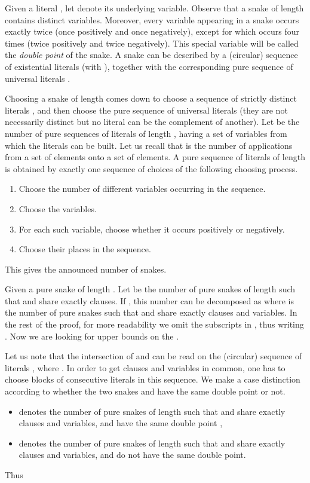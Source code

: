 \documentclass[aop,noinfoline]{imsart}
\renewcommand{\Box}{{\vrule width0.6ex height1em depth0cm}}
\newenvironment{proof}{\noindent{\bf Proof:}}{\hfill \Box}
\begin{document}
\begin{proof}
Given a literal , let  denote its underlying variable. Observe that a snake of length  contains  distinct variables.  Moreover, every variable  appearing in a snake occurs exactly twice (once positively and once negatively), except for  which occurs four times (twice positively and twice negatively). This special variable will be called the \emph{double point} of the snake. A snake can be   described by a (circular) sequence of existential literals  (with ), together with the corresponding pure sequence of universal literals . 

Choosing a snake  of length  comes down to choose a sequence of   strictly distinct
literals ,   and then   choose the pure sequence of  universal literals  (they are not necessarily distinct but no literal can be the
  complement of another).
  Let  be the number of pure sequences of literals of length
  , having a set of  variables from which the literals can be
  built.  Let us recall that  is the number of
  applications from a set of  elements onto a set of  elements.
  A pure sequence of literals of length  is obtained by exactly
  one sequence of choices of the following choosing process.
  \begin{enumerate}
  \item Choose the number  of different variables occurring in the
    sequence.
  \item Choose the  variables.
  \item For each such variable, choose whether it occurs positively or
    negatively.
  \item Choose their places in the sequence.
  \end{enumerate}
This gives the announced number of snakes.
\medskip

Given a pure snake  of length . Let  be the
number of pure snakes  of length   such  that  and  share exactly  
clauses. If , this number can be decomposed as
 where  is the number of  pure snakes  such  that  and  share exactly   clauses and  variables. In the rest of the proof, for more readability we omit the subscripts  in , thus writing . Now we are looking for  upper bounds on the .

Let us note that the intersection of  and  can be read on the (circular) sequence of literals
 , where .  In order to get  clauses and  variables in common, one has to choose  blocks of consecutive literals in this sequence. 
We make a case distinction according to whether the two snakes   and  have the same double point or not.
\begin{itemize}
 \item  denotes the  number of pure snakes  of length  such
that   and  share exactly   clauses and  variables, and have the same double point ,
\item  denotes the  number of pure snakes  of length  such
that   and  share exactly   clauses and  variables, and do not have    the same double point.\\
\end{itemize}
Thus   


\end{proof}
\end{document}

